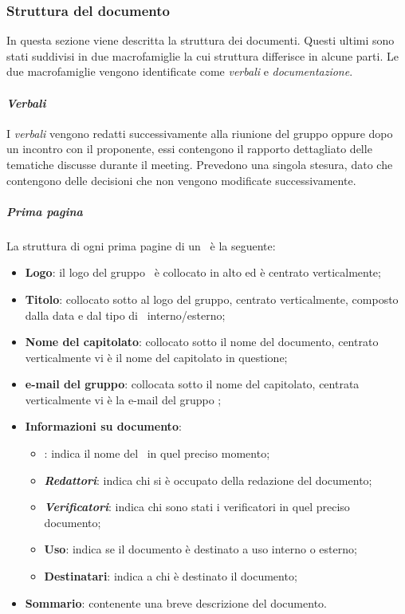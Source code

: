 \subsubsection{Struttura del documento}
In questa sezione viene descritta la struttura dei documenti. Questi ultimi sono stati suddivisi in due macrofamiglie la cui struttura differisce in alcune parti. Le due macrofamiglie vengono identificate come \textit{verbali} e \textit{documentazione}.
\paragraph{\textit{Verbali}}
I \textit{verbali} vengono redatti successivamente alla riunione del gruppo oppure dopo un incontro con il proponente, essi contengono il rapporto dettagliato delle tematiche discusse durante il meeting. 
Prevedono una singola stesura, dato che contengono delle decisioni che non vengono modificate successivamente.

    \subparagraph{Prima pagina}
    La struttura di ogni prima pagine di un \docNameVLow\ è la seguente:
    \begin{itemize}
        \item \textbf{Logo}: il logo del gruppo \groupName\ è collocato in alto ed è centrato verticalmente;
        \item \textbf{Titolo}: collocato sotto al logo del gruppo, centrato verticalmente, composto dalla data e dal tipo di \docNameVLow\ interno/esterno;
        \item \textbf{Nome del capitolato}: collocato sotto il nome del documento, centrato verticalmente vi è il nome del capitolato in questione;
        \item \textbf{e-mail del gruppo}: collocata sotto il nome del capitolato, centrata verticalmente vi è la e-mail del gruppo \groupName;
        \item \textbf{Informazioni su documento}:
        \begin{itemize}
            \item \textbf{\roleProjectManager}: indica il nome del \roleProjectManagerLow\ in quel preciso momento;
            \item \textbf{\textit{Redattori}}: indica chi si è occupato della redazione del documento;
            \item \textbf{\textit{Verificatori}}: indica chi sono stati i verificatori in quel preciso documento;
            \item \textbf{Uso}: indica se il documento è destinato a uso interno o esterno;
            \item \textbf{Destinatari}: indica a chi è destinato il documento;
        \end{itemize}
        \item \textbf{Sommario}: contenente una breve descrizione del documento.
    \end {itemize}

